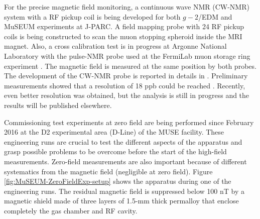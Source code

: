 For the precise magnetic field monitoring, a continuous wave
NMR (CW-NMR) system with a RF pickup coil is being developed
for both $g-2$/EDM and MuSEUM experiments at J-PARC.  A field
mapping probe with 24 RF pickup coils is being constructed
to scan the muon stopping spheroid inside the MRI magnet.
Also, a cross calibration test is in progress at Argonne
National Laboratory with the pulse-NMR probe used at the
FermiLab muon storage ring experiment \cite{Bennett:2006fi}.
The magnetic field is measured at the same position by both
probes.  The development of the CW-NMR probe is reported in
details in \cite{T.Tanaka-etal-PSAS2018}.  Preliminary
measurements showed that a resolution of 18 ppb could be
reached \cite{Sasaki-etal-IEEE}.  Recently, even better
resolution was obtained, but the analysis is still in progress
and the results will be published elsewhere.


Commissioning test experiments at zero field are being performed
since February 2016 at the D2 experimental area (D-Line) of
the MUSE facility.  These engineering runs are crucial to test
the different aspects of the apparatus and grasp possible
problems to be overcome before the start of the high-field
measurements.  Zero-field measurements are also important
because of different systematics from the magnetic field
(negligible at zero field).  Figure \ref{fig:MuSEUM-ZeroFieldExp-setup}
shows the apparatus during one of the engineering runs.  
The residual magnetic field is suppressed below 100 nT
by a magnetic shield made of three layers of 1.5-mm thick
permalloy that enclose completely the gas chamber and RF cavity.

